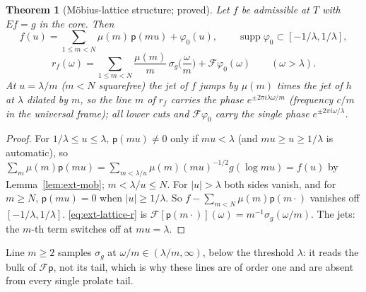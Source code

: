 \documentclass[11pt]{amsart}
\newtheorem{theorem}{Theorem}[section]
\theoremstyle{definition}
\theoremstyle{remark}
\newcommand{\supp}{\operatorname{supp}}
\begin{document}
\begin{theorem}[M\"obius-lattice structure; proved]\label{thm:ext-lattice}
Let $f$ be admissible at $T$ with $Ef=g$ in the core. Then
\begin{equation}\label{eq:ext-lattice}
f(u)=\sum_{1\le m<N}\mu(m)\,\mathsf p(mu)+\varphi_0(u),\qquad \supp\varphi_0\subset[-1/\lambda,1/\lambda],
\end{equation}
\begin{equation}\label{eq:ext-lattice-r}
r_f(\omega)=\sum_{1\le m<N}\frac{\mu(m)}m\,\sigma_g\Big(\frac\omega m\Big)+\mathcal F\varphi_0(\omega)\qquad(\omega>\lambda).
\end{equation}
At $u=\lambda/m$ ($m<N$ squarefree) the jet of $f$ jumps by $\mu(m)$ times the jet of $h$ at $\lambda$ dilated by $m$, so the line
$m$ of $r_f$ carries the phase $e^{\pm2\pi i\lambda\omega/m}$ (frequency $c/m$ in the universal frame); all lower cuts and
$\mathcal F\varphi_0$ carry the single phase $e^{\pm2\pi i\omega/\lambda}$.
\end{theorem}
\begin{proof}
For $1/\lambda\le u\le\lambda$, $\mathsf p(mu)\ne0$ only if $mu<\lambda$ (and $mu\ge u\ge1/\lambda$ is automatic), so
$\sum_m\mu(m)\mathsf p(mu)=\sum_{m<\lambda/u}\mu(m)(mu)^{-1/2}g(\log mu)=f(u)$ by Lemma~\ref{lem:ext-mob}; $m<\lambda/u\le N$. For
$|u|>\lambda$ both sides vanish, and for $m\ge N$, $\mathsf p(mu)=0$ when $|u|\ge1/\lambda$. So $f-\sum_{m<N}\mu(m)\mathsf p(m\cdot)$
vanishes off $[-1/\lambda,1/\lambda]$. \eqref{eq:ext-lattice-r} is $\mathcal F[\mathsf p(m\cdot)](\omega)=m^{-1}\sigma_g(\omega/m)$. The jets: the
$m$-th term switches off at $mu=\lambda$.
\end{proof}

Line $m\ge2$ samples $\sigma_g$ at $\omega/m\in(\lambda/m,\infty)$, below the threshold $\lambda$: it reads the bulk of $\mathcal F\mathsf p$,
not its tail, which is why these lines are of order one and are absent from every single prolate tail.
\end{document}
